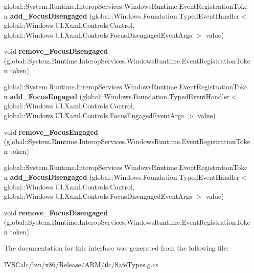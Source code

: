 \begin{DoxyCompactItemize}
global\+::\+System.\+Runtime.\+Interop\+Services.\+Windows\+Runtime.\+Event\+Registration\+Token {\bfseries add\+\_\+\+Focus\+Disengaged} (global\+::\+Windows.\+Foundation.\+Typed\+Event\+Handler$<$ global\+::\+Windows.\+U\+I.\+Xaml.\+Controls.\+Control, global\+::\+Windows.\+U\+I.\+Xaml.\+Controls.\+Focus\+Disengaged\+Event\+Args $>$ value)
\item 
\mbox{\label{interface_windows_1_1_u_i_1_1_xaml_1_1_controls_1_1_i_control4_ae123018ef2852af850d529f171eb60f3}} 
void {\bfseries remove\+\_\+\+Focus\+Disengaged} (global\+::\+System.\+Runtime.\+Interop\+Services.\+Windows\+Runtime.\+Event\+Registration\+Token token)
\item 
\mbox{\label{interface_windows_1_1_u_i_1_1_xaml_1_1_controls_1_1_i_control4_aace904cbad444f4b1b7a2a18d9a214b9}} 
global\+::\+System.\+Runtime.\+Interop\+Services.\+Windows\+Runtime.\+Event\+Registration\+Token {\bfseries add\+\_\+\+Focus\+Engaged} (global\+::\+Windows.\+Foundation.\+Typed\+Event\+Handler$<$ global\+::\+Windows.\+U\+I.\+Xaml.\+Controls.\+Control, global\+::\+Windows.\+U\+I.\+Xaml.\+Controls.\+Focus\+Engaged\+Event\+Args $>$ value)
\item 
\mbox{\label{interface_windows_1_1_u_i_1_1_xaml_1_1_controls_1_1_i_control4_a382ea6b14878ea7b5e2b4ba178cd1018}} 
void {\bfseries remove\+\_\+\+Focus\+Engaged} (global\+::\+System.\+Runtime.\+Interop\+Services.\+Windows\+Runtime.\+Event\+Registration\+Token token)
\item 
\mbox{\label{interface_windows_1_1_u_i_1_1_xaml_1_1_controls_1_1_i_control4_a680a8edc30b4ba72807571ed0e1513ee}} 
global\+::\+System.\+Runtime.\+Interop\+Services.\+Windows\+Runtime.\+Event\+Registration\+Token {\bfseries add\+\_\+\+Focus\+Disengaged} (global\+::\+Windows.\+Foundation.\+Typed\+Event\+Handler$<$ global\+::\+Windows.\+U\+I.\+Xaml.\+Controls.\+Control, global\+::\+Windows.\+U\+I.\+Xaml.\+Controls.\+Focus\+Disengaged\+Event\+Args $>$ value)
\item 
\mbox{\label{interface_windows_1_1_u_i_1_1_xaml_1_1_controls_1_1_i_control4_ae123018ef2852af850d529f171eb60f3}} 
void {\bfseries remove\+\_\+\+Focus\+Disengaged} (global\+::\+System.\+Runtime.\+Interop\+Services.\+Windows\+Runtime.\+Event\+Registration\+Token token)
\end{DoxyCompactItemize}


The documentation for this interface was generated from the following file\+:\begin{DoxyCompactItemize}
\item 
I\+V\+S\+Calc/bin/x86/\+Release/\+A\+R\+M/ilc/Safe\+Types.\+g.\+cs\end{DoxyCompactItemize}
